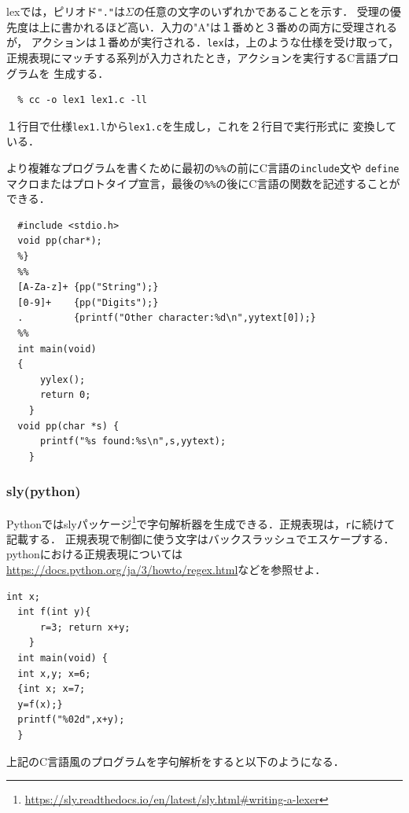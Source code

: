 \documentclass[a4j,dvipdfmx]{jbook}
\begin{document}
lexでは，ピリオド\texttt{"."}は$\Sigma$の任意の文字のいずれかであることを示す．
受理の優先度は上に書かれるほど高い．入力の"A"は１番めと３番めの両方に受理されるが，
アクションは１番めが実行される．\texttt{lex}は，上のような仕様を受け取って，
正規表現にマッチする系列が入力されたとき，アクションを実行するC言語プログラムを
生成する．

\begin{Verbatim}[frame=single]
  % lex -o lex1.c lex1.l
  % cc -o lex1 lex1.c -ll
\end{Verbatim}


１行目で仕様\texttt{lex1.l}から\texttt{lex1.c}を生成し，これを２行目で実行形式に
変換している．

より複雑なプログラムを書くために最初の\verb|%%|の前にC言語の\texttt{include}文や
\texttt{define}マクロまたはプロトタイプ宣言，最後の\verb|%%|の後にC言語の関数を記述することができる．

\begin{Verbatim}[frame=single]
  %{
  #include <stdio.h>
  void pp(char*);
  %}
  %%
  [A-Za-z]+ {pp("String");}
  [0-9]+    {pp("Digits");}
  .         {printf("Other character:%d\n",yytext[0]);}
  %%
  int main(void)
  {
      yylex();
      return 0;
    }
  void pp(char *s) {
      printf("%s found:%s\n",s,yytext);
    }
\end{Verbatim}

\subsubsection{sly(python)}

Pythonではslyパッケージ\footnote{\url{https://sly.readthedocs.io/en/latest/sly.html#writing-a-lexer}}で字句解析器を生成できる．正規表現は，\texttt{r}に続けて記載する．
正規表現で制御に使う文字はバックスラッシュでエスケープする．pythonにおける正規表現については
\url{https://docs.python.org/ja/3/howto/regex.html}などを参照せよ．

\begin{Verbatim}[frame=single]
  int x;
  int f(int y){
      r=3; return x+y;
    }
  int main(void) {
  int x,y; x=6;
  {int x; x=7;
  y=f(x);}
  printf("%02d",x+y);
  }
\end{Verbatim}

上記のC言語風のプログラムを字句解析をすると以下のようになる．
\end{document}
